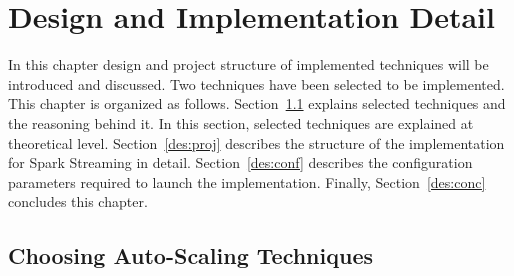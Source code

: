 \chapter{Design and Implementation Detail}
\label{design}
In this chapter design and project structure of implemented techniques will be introduced and discussed. Two techniques have been selected to be implemented. This chapter is organized as follows. Section~\ref{des:choose} explains selected techniques and the reasoning behind it. In this section, selected techniques are explained at theoretical level. Section~\ref{des:proj} describes the structure of the implementation for Spark Streaming in detail. Section~\ref{des:conf} describes the configuration parameters required to launch the implementation. Finally, Section~\ref{des:conc} concludes this chapter.

\section{Choosing Auto-Scaling Techniques}
\label{des:choose}

